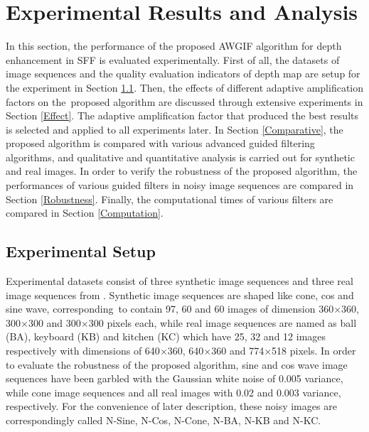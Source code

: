\documentclass[a4paper,fleqn]{cas-dc}
\begin{document}
\section{Experimental Results and Analysis}\label{Experiment}
In this section, the performance of the proposed AWGIF algorithm for depth enhancement in SFF is evaluated experimentally. First of all, the datasets of image sequences and the quality evaluation indicators of depth map are setup for the experiment in Section \ref{Setup}. Then, the effects of different adaptive amplification factors on the proposed algorithm are discussed through extensive experiments in Section \ref{Effect}. The adaptive amplification factor that produced the best results is selected and applied to all experiments later. In Section \ref{Comparative}, the proposed algorithm is compared with various advanced guided filtering algorithms, and qualitative and quantitative analysis is carried out for synthetic and real images. In order to verify the robustness of the proposed algorithm, the performances of various guided filters in noisy image sequences are compared in Section \ref{Robustness}. Finally, the computational times of various filters are compared in Section \ref{Computation}.

\subsection{Experimental Setup}\label{Setup}
Experimental datasets consist of three synthetic image sequences and three real image sequences from \cite{mahmood2012nonlinear,suwajanakorn2015depth}. Synthetic image sequences are shaped like cone, cos and sine wave, corresponding to contain 97, 60 and 60 images of dimension 360$\times$360, 300$\times$300 and 300$\times$300 pixels each, while real image sequences are named as ball (BA), keyboard (KB) and kitchen (KC) which have 25, 32 and 12 images respectively with dimensions of 640$\times$360, 640$\times$360 and 774$\times$518 pixels. In order to evaluate the robustness of the proposed algorithm, sine and cos wave image sequences have been garbled with the Gaussian white noise of 0.005 variance, while cone image sequences and all real images with 0.02 and 0.003 variance, respectively. For the convenience of later description, these noisy images are correspondingly called N-Sine, N-Cos, N-Cone, N-BA, N-KB and N-KC.   
\end{document}
